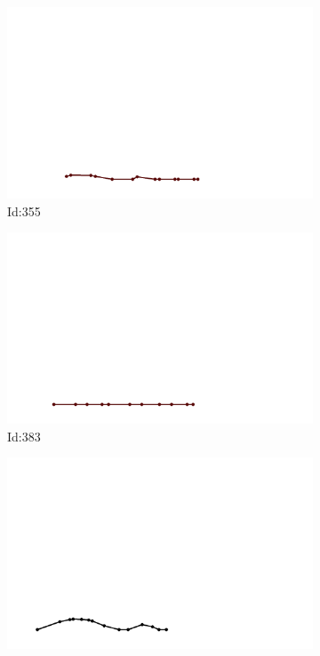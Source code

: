\documentclass[12pt,twoside]{report}
\begin{document}
\begin{figure}
\centering
\begin{subfigure}[b]{0.20\textwidth}
\centering
\includegraphics[width=\textwidth]{../../trajectories/355.png}
\caption{Id:355}
\end{subfigure}
\begin{subfigure}[b]{0.20\textwidth}
\centering
\includegraphics[width=\textwidth]{../../trajectories/383.png}
\caption{Id:383}
\end{subfigure}
\begin{subfigure}[b]{0.20\textwidth}
\centering
\includegraphics[width=\textwidth]{../../trajectories/507.png}

\end{subfigure}
\end{figure}
\end{document}
